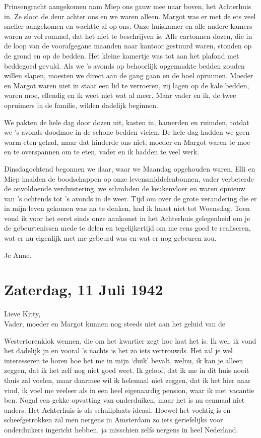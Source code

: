 \documentclass{book}
\begin{document}
Prinsengracht aangekomen nam Miep ons gauw mee naar boven, het
Achterhuis in. Ze sloot de deur achter ons en we waren alleen. Margot
was er met de ets veel sneller aangekomen en wachtte al op ons. Onze
huiskamer en alle andere kamers waren zo vol rommel, dat het niet te
beschrijven is. Alle cartonnen dozen, die in de loop van de voorafgegane
maanden naar kantoor gestuurd waren, stonden op de grond en op de
bedden. Het kleine kamertje was tot aan het plafond met beddegoed
gevuld. Als we 's avonds op behoorlijk opgemaakte bedden zouden willen
slapen, moesten we direct aan de gang gaan en de boel opruimen. Moeder
en Margot waren niet in staat een lid te verroeren, zij lagen op de kale
bedden, waren moe, ellendig en ik weet niet wat al meer. Maar vader en
ik, de twee opruimers in de familie, wilden dadelijk beginnen.

We pakten de hele dag door dozen uit, kasten in, hamerden en ruimden,
totdat we 's avonds doodmoe in de schone bedden vielen. De hele dag
hadden we geen warm eten gehad, maar dat hinderde ons niet; moeder en
Margot waren te moe en te overspannen om te eten, vader en ik hadden te
veel werk.

Dinsdagochtend begonnen we daar, waar we Maandag opgehouden waren. Elli
en Miep haalden de boodschappen op onze levensmiddelenbonnen, vader
verbeterde de onvoldoende verduistering, we schrobden de keukenvloer en
waren opnieuw van 's ochtends tot 's avonds in de weer. Tijd om over de
grote verandering die er in mijn leven gekomen was na te denken, had ik
haast niet tot Woensdag. Toen vond ik voor het eerst sinds onze aankomst
in het Achterhuis gelegenheid om je de gebeurtenissen mede te delen en
tegelijkertijd om me eens goed te realiseren, wat er nu eigenlijk met me
gebeurd was en wat er nog gebeuren zou.

Je Anne.

\chapter{Zaterdag, 11 Juli 1942}

Lieve Kitty,\\Vader, moeder en Margot kunnen nog steeds niet aan het
geluid van de

Westertorenklok wennen, die om het kwartier zegt hoe laat het is. Ik
wel, ik vond het dadelijk jn en vooral 's nachts is het zo iets
vertrouwds. Het zal je wel interesseren te horen hoe het me in mijn
`duik' bevalt, welnu, ik kan je alleen zeggen, dat ik het zelf nog niet
goed weet. Ik geloof, dat ik me in dit huis nooit thuis zal voelen, maar
daarmee wil ik helemaal niet zeggen, dat ik het hier naar vind, ik voel
me veeleer als in een heel eigenaardig pension, waar ik met vacantie
ben. Nogal een gekke opvatting van onderduiken, maar het is nu eenmaal
niet anders. Het Achterhuis is als schuilplaats ideaal. Hoewel het
vochtig is en scheefgetrokken zal men nergens in Amsterdam zo iets
geriefelijks voor onderduikers ingericht hebben, ja misschien zelfs
nergens in heel Nederland.
\end{document}
